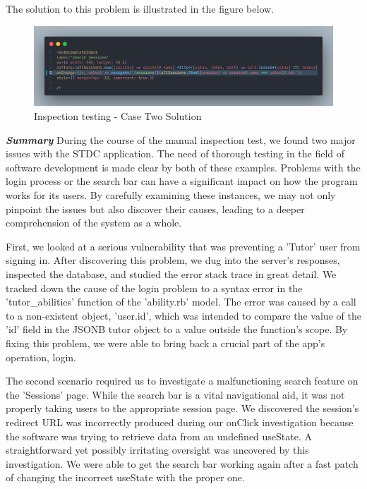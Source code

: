 \begin{justify}
    \vspace{0.25cm}
    \newendline The solution to this problem is illustrated in the figure below.
    
    \begin{figure}[H]
        \centerline{\includegraphics[width=150mm,scale=1]{figures/implementation_and_testing/testing/MIS/allcourses error fix.png}}
        \caption{Inspection testing - Case Two Solution}
        \label{Inspection_search_defect_fix}
    \end{figure}

    
    \clearpage
    \newendline \textbf{\textit{Summary}}\newendline
    During the course of the manual inspection test, we found two major issues with the STDC application. The need of thorough testing in the field of software development is made clear by both of these examples. Problems with the login process or the search bar can have a significant impact on how the program works for its users. By carefully examining these instances, we may not only pinpoint the issues but also discover their causes, leading to a deeper comprehension of the system as a whole.

    \vspace{0.25cm}
    \newendline First, we looked at a serious vulnerability that was preventing a 'Tutor' user from signing in. After discovering this problem, we dug into the server's responses, inspected the database, and studied the error stack trace in great detail. We tracked down the cause of the login problem to a syntax error in the 'tutor\_abilities' function of the 'ability.rb' model. The error was caused by a call to a non-existent object, 'user.id', which was intended to compare the value of the 'id' field in the JSONB tutor object to a value outside the function's scope. By fixing this problem, we were able to bring back a crucial part of the app's operation, login.
    
    \vspace{0.25cm}
    \newendline The second scenario required us to investigate a malfunctioning search feature on the 'Sessions' page. While the search bar is a vital navigational aid, it was not properly taking users to the appropriate session page. We discovered the session's redirect URL was incorrectly produced during our onClick investigation because the software was trying to retrieve data from an undefined useState. A straightforward yet possibly irritating oversight was uncovered by this investigation. We were able to get the search bar working again after a fast patch of changing the incorrect useState with the proper one.
    

\end{justify}
